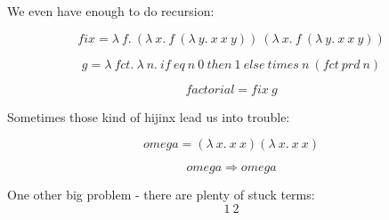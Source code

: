 \begin{frame}
  We even have enough to do recursion:
  
  \[fix = \lambda~f.~\left(\lambda~x.~f~\left(\lambda~y.~x~x~y\right)\right)~\left(\lambda~x.~f~\left(\lambda~y.~x~x~y\right)\right)\]

  \[g = \lambda~fct.~\lambda~n.~if~eq~n~0~then~1~else~times~n~\left(fct~prd~n\right)\]

  \[factorial = fix~g\]
\end{frame}

\begin{frame}
  Sometimes those kind of hijinx lead us into trouble:
  
  \[omega = \left(\lambda~x.~x~x\right) \left(\lambda~x.~x~x\right)\]

  \[omega \Rightarrow omega\]
\end{frame}

\begin{frame}
  One other big problem - there are plenty of stuck terms:
  \[1~2\]
\end{frame}


